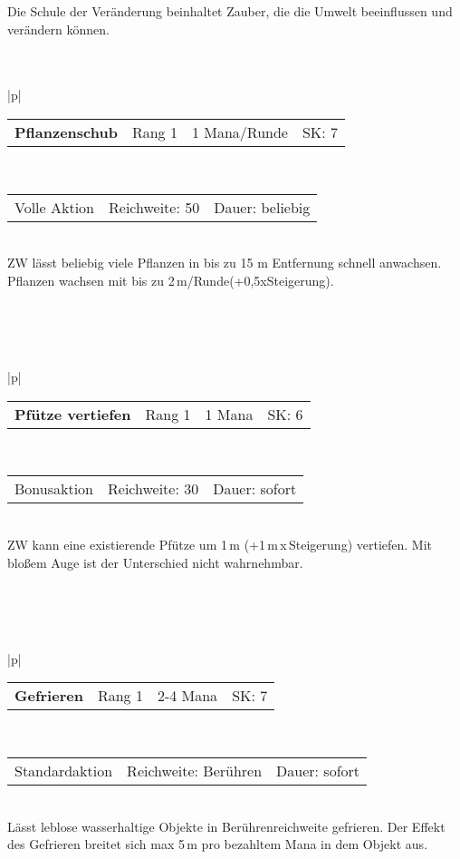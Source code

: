\documentclass[../../Heldenanleitung2]{subfiles}
\begin{document}
Die Schule der Veränderung beinhaltet Zauber, die die Umwelt beeinflussen und verändern können.
\\\\\\
\begin{tabular}{|p{\textwidth}|}
\hline
\begin{tabularx}{\textwidth}{X|X|X|X}
\textbf{Pflanzenschub} & Rang 1 & 1 Mana/Runde & SK: 7
\end{tabularx} \\ \hline
\begin{tabularx}{\textwidth}{X|X|X}
Volle Aktion & Reichweite: 50 & Dauer: beliebig
\end{tabularx} \\ \hline
ZW lässt beliebig viele Pflanzen in bis zu 15 m Entfernung schnell anwachsen. Pflanzen wachsen mit bis zu 2\,m/Runde(+0,5xSteigerung).
\\ \hline
\end{tabular}
\\\\\\
\begin{tabular}{|p{\textwidth}|}
\hline
\begin{tabularx}{\textwidth}{X|X|X|X}
\textbf{Pfütze vertiefen} & Rang 1 & 1 Mana & SK: 6
\end{tabularx} \\ \hline
\begin{tabularx}{\textwidth}{X|X|X}
Bonusaktion & Reichweite: 30 & Dauer: sofort
\end{tabularx} \\ \hline
ZW kann eine existierende Pfütze um 1\,m (+1\,m\,x\,Steigerung) vertiefen. Mit bloßem Auge ist der Unterschied nicht wahrnehmbar.
\\ \hline
\end{tabular}
\\\\\\
\begin{tabular}{|p{\textwidth}|}
\hline
\begin{tabularx}{\textwidth}{X|X|X|X}
\textbf{Gefrieren} & Rang 1 & 2-4 Mana & SK: 7
\end{tabularx} \\ \hline
\begin{tabularx}{\textwidth}{X|X|X}
Standardaktion & Reichweite: Berühren & Dauer: sofort
\end{tabularx} \\ \hline
Lässt leblose wasserhaltige Objekte in Berührenreichweite gefrieren. Der Effekt des Gefrieren breitet sich max 5\,m pro bezahltem Mana in dem Objekt aus.
\\ \hline
\end{tabular}
\end{document}

